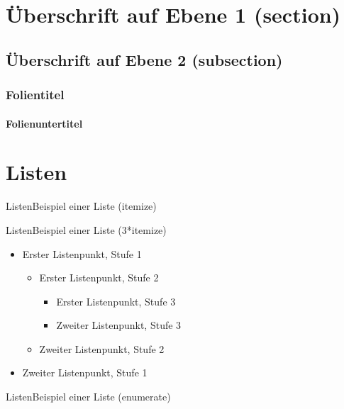 \section{Überschrift auf Ebene 1 (section)} %

\subsection{Überschrift auf Ebene 2 (subsection)} %

\begin{frame}
    \frametitle{Folientitel}
    \framesubtitle{Folienuntertitel}
    \blindtext
\end{frame}


\section{Listen} %

\begin{frame}{Listen}{Beispiel einer Liste (itemize)}
    \blinditemize
\end{frame}

\begin{frame}{Listen}{Beispiel einer Liste (3*itemize)}
    \begin{itemize}
        \item Erster Listenpunkt, Stufe 1
        \begin{itemize}
            \item Erster Listenpunkt, Stufe 2
            \begin{itemize}
                \item Erster Listenpunkt, Stufe 3
                \item Zweiter Listenpunkt, Stufe 3
            \end{itemize}
            \item Zweiter Listenpunkt, Stufe 2
        \end{itemize}
        \item Zweiter Listenpunkt, Stufe 1
    \end{itemize}
\end{frame}

\begin{frame}{Listen}{Beispiel einer Liste (enumerate)}
    \blindenumerate
\end{frame}

